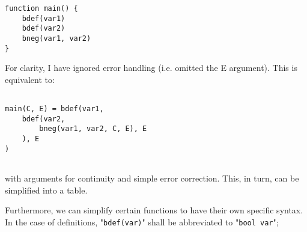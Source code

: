 \documentclass[Master.tex]{subfiles}
\begin{document}
\begin{lstlisting}
function main() {
	bdef(var1)
	bdef(var2)
	bneg(var1, var2)
}
\end{lstlisting}
For clarity, I have ignored error handling (i.e. omitted the E argument). This is equivalent to:

\begin{lstlisting}

main(C, E) = bdef(var1,
    bdef(var2,
        bneg(var1, var2, C, E), E
    ), E
)


\end{lstlisting}
with arguments for continuity and simple error correction. This, in turn, can be simplified into a table.

Furthermore, we can simplify certain functions to have their own specific syntax. In the case of definitions, "\lstinline{bdef(var)}" shall be abbreviated to "\lstinline{bool var}";
\end{document}
